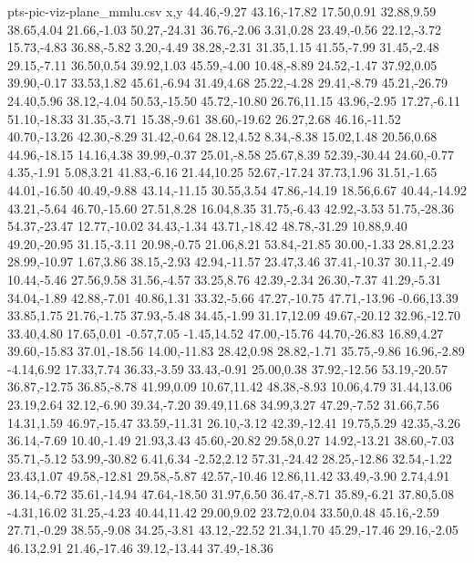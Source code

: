 \begin{filecontents*}[overwrite]{pts-pic-viz-plane_mmlu.csv}
x,y
44.46,-9.27
43.16,-17.82
17.50,0.91
32.88,9.59
38.65,4.04
21.66,-1.03
50.27,-24.31
36.76,-2.06
3.31,0.28
23.49,-0.56
22.12,-3.72
15.73,-4.83
36.88,-5.82
3.20,-4.49
38.28,-2.31
31.35,1.15
41.55,-7.99
31.45,-2.48
29.15,-7.11
36.50,0.54
39.92,1.03
45.59,-4.00
10.48,-8.89
24.52,-1.47
37.92,0.05
39.90,-0.17
33.53,1.82
45.61,-6.94
31.49,4.68
25.22,-4.28
29.41,-8.79
45.21,-26.79
24.40,5.96
38.12,-4.04
50.53,-15.50
45.72,-10.80
26.76,11.15
43.96,-2.95
17.27,-6.11
51.10,-18.33
31.35,-3.71
15.38,-9.61
38.60,-19.62
26.27,2.68
46.16,-11.52
40.70,-13.26
42.30,-8.29
31.42,-0.64
28.12,4.52
8.34,-8.38
15.02,1.48
20.56,0.68
44.96,-18.15
14.16,4.38
39.99,-0.37
25.01,-8.58
25.67,8.39
52.39,-30.44
24.60,-0.77
4.35,-1.91
5.08,3.21
41.83,-6.16
21.44,10.25
52.67,-17.24
37.73,1.96
31.51,-1.65
44.01,-16.50
40.49,-9.88
43.14,-11.15
30.55,3.54
47.86,-14.19
18.56,6.67
40.44,-14.92
43.21,-5.64
46.70,-15.60
27.51,8.28
16.04,8.35
31.75,-6.43
42.92,-3.53
51.75,-28.36
54.37,-23.47
12.77,-10.02
34.43,-1.34
43.71,-18.42
48.78,-31.29
10.88,9.40
49.20,-20.95
31.15,-3.11
20.98,-0.75
21.06,8.21
53.84,-21.85
30.00,-1.33
28.81,2.23
28.99,-10.97
1.67,3.86
38.15,-2.93
42.94,-11.57
23.47,3.46
37.41,-10.37
30.11,-2.49
10.44,-5.46
27.56,9.58
31.56,-4.57
33.25,8.76
42.39,-2.34
26.30,-7.37
41.29,-5.31
34.04,-1.89
42.88,-7.01
40.86,1.31
33.32,-5.66
47.27,-10.75
47.71,-13.96
-0.66,13.39
33.85,1.75
21.76,-1.75
37.93,-5.48
34.45,-1.99
31.17,12.09
49.67,-20.12
32.96,-12.70
33.40,4.80
17.65,0.01
-0.57,7.05
-1.45,14.52
47.00,-15.76
44.70,-26.83
16.89,4.27
39.60,-15.83
37.01,-18.56
14.00,-11.83
28.42,0.98
28.82,-1.71
35.75,-9.86
16.96,-2.89
-4.14,6.92
17.33,7.74
36.33,-3.59
33.43,-0.91
25.00,0.38
37.92,-12.56
53.19,-20.57
36.87,-12.75
36.85,-8.78
41.99,0.09
10.67,11.42
48.38,-8.93
10.06,4.79
31.44,13.06
23.19,2.64
32.12,-6.90
39.34,-7.20
39.49,11.68
34.99,3.27
47.29,-7.52
31.66,7.56
14.31,1.59
46.97,-15.47
33.59,-11.31
26.10,-3.12
42.39,-12.41
19.75,5.29
42.35,-3.26
36.14,-7.69
10.40,-1.49
21.93,3.43
45.60,-20.82
29.58,0.27
14.92,-13.21
38.60,-7.03
35.71,-5.12
53.99,-30.82
6.41,6.34
-2.52,2.12
57.31,-24.42
28.25,-12.86
32.54,-1.22
23.43,1.07
49.58,-12.81
29.58,-5.87
42.57,-10.46
12.86,11.42
33.49,-3.90
2.74,4.91
36.14,-6.72
35.61,-14.94
47.64,-18.50
31.97,6.50
36.47,-8.71
35.89,-6.21
37.80,5.08
-4.31,16.02
31.25,-4.23
40.44,11.42
29.00,9.02
23.72,0.04
33.50,0.48
45.16,-2.59
27.71,-0.29
38.55,-9.08
34.25,-3.81
43.12,-22.52
21.34,1.70
45.29,-17.46
29.16,-2.05
46.13,2.91
21.46,-17.46
39.12,-13.44
37.49,-18.36

\end{filecontents*}
